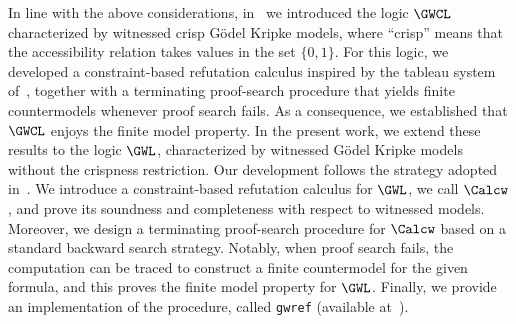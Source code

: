 In line with the above considerations, in~\cite{FerFioRod:2025} we
introduced the logic $\GWCL$ characterized by witnessed crisp G\"odel
Kripke models, where ``crisp'' means that the accessibility relation
takes values in the set $\{0,1\}$.  For this logic, we developed a
constraint-based refutation calculus inspired by the tableau system
of~\cite{BilkovaFK:22}, together with a terminating proof-search
procedure that yields finite countermodels whenever proof search
fails. As a consequence, we established that $\GWCL$ enjoys the finite
model property.  In the present work, we extend these results to the
logic $\GWL$, characterized by witnessed G\"odel Kripke models without
the crispness restriction. Our development follows the
strategy adopted in~\cite{FerFioRod:2025}.  We introduce a
constraint-based refutation calculus for $\GWL$, we call $\Calcw$, and
prove its soundness and completeness with respect to witnessed
models. Moreover, we design a terminating proof-search procedure for
$\Calcw$ based on a standard backward search strategy.  Notably, when
proof search fails, the computation can be traced to construct a
finite countermodel for the given formula, and this proves the finite
model property for $\GWL$.  Finally, we provide an implementation of
the procedure, called \texttt{gwref} (available
at~\cite{gwrefProver}).




